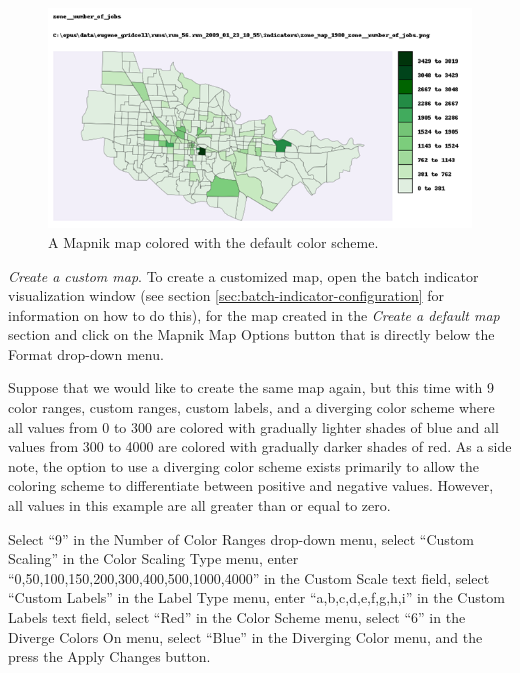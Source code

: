 \begin{figure}[ht]
\begin{center}
\includegraphics[width=\textwidth]{part-gui/images/sample-map-default-settings.png}
\end{center}
\caption{A Mapnik map colored with the default color scheme.}
\label{fig:sample-map-default-settings}
\end{figure}
\clearpage

\emph{Create a custom map}. To create a customized map, 
open the batch indicator visualization window (see section 
\ref{sec:batch-indicator-configuration} for information on 
how to do this), for the map created in the \emph{Create a default map}
section and click on the Mapnik Map Options button that is directly 
below the Format drop-down menu.

Suppose that we would like to create the same map again, but this time 
with 9 color ranges, custom ranges, custom labels, and a diverging color 
scheme where all values from 0 to 300 are colored with gradually lighter 
shades of blue and all values from 300 to 4000 are colored with gradually 
darker shades of red. As a side note, the option to use a diverging color 
scheme exists primarily to allow the coloring scheme to differentiate 
between positive and negative values.  However, all values in 
this example are all greater than or equal to zero.

Select ``9'' in the Number of Color Ranges drop-down menu, select 
``Custom Scaling'' in the Color Scaling Type menu, enter 
``0,50,100,150,200,300,400,500,1000,4000'' in the Custom Scale text field, 
select ``Custom Labels'' in the Label Type menu, enter ``a,b,c,d,e,f,g,h,i'' 
in the Custom Labels text field, select ``Red'' in the Color Scheme menu, 
select ``6'' in the Diverge Colors On menu, select ``Blue'' in the Diverging 
Color menu, and the press the Apply Changes button.

